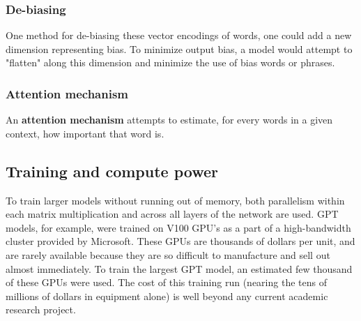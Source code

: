 \documentclass[titlepage, 12pt, leqno]{article}
\begin{document}
\subsubsection{De-biasing}
One method for de-biasing these vector encodings of words, one could add a new
dimension representing bias. To minimize output bias, a model would attempt to
"flatten" along this dimension and minimize the use of bias words or phrases.

\subsubsection{Attention mechanism}
\begin{definition}
    An \textbf{attention mechanism} attempts to estimate, for every words in a
    given context, how important that word is.
\end{definition}

\subsection{Training and compute power}
To train larger models without running out of memory, both parallelism within
each matrix multiplication and across all layers of the network are used. GPT
models, for example, were trained on V100 GPU's as a part of a high-bandwidth
cluster provided by Microsoft. These GPUs are thousands of dollars per unit, and
are rarely available because they are so difficult to manufacture and sell out
almost immediately. To train the largest GPT model, an estimated few thousand
of these GPUs were used. The cost of this training run (nearing the tens of
millions of dollars in equipment alone) is well beyond any current academic
research project.
\end{document}
